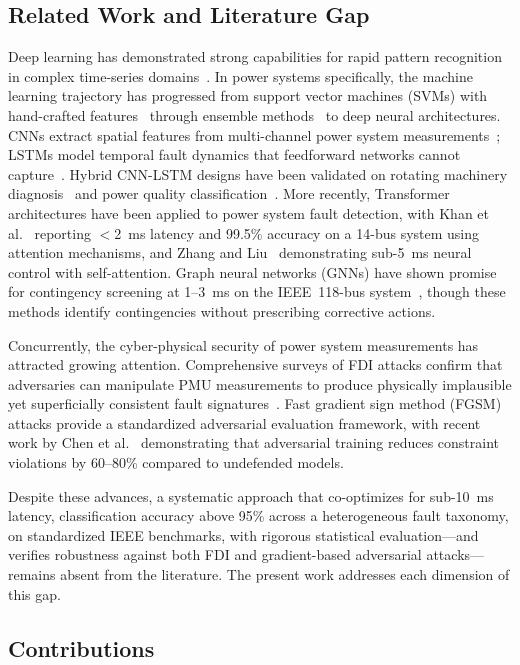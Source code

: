 \documentclass[journal]{IEEEtran}
\begin{document}
\subsection{Related Work and Literature Gap}

Deep learning has demonstrated strong capabilities for rapid pattern recognition in complex time-series domains~\cite{ref6}. In power systems specifically, the machine learning trajectory has progressed from support vector machines (SVMs) with hand-crafted features~\cite{ref7} through ensemble methods~\cite{ref8} to deep neural architectures. CNNs extract spatial features from multi-channel power system measurements~\cite{ref9}; LSTMs model temporal fault dynamics that feedforward networks cannot capture~\cite{ref10}. Hybrid CNN-LSTM designs have been validated on rotating machinery diagnosis~\cite{ref11} and power quality classification~\cite{ref12}. More recently, Transformer architectures have been applied to power system fault detection, with Khan et al.~\cite{ref_khan} reporting $<$2~ms latency and 99.5\% accuracy on a 14-bus system using attention mechanisms, and Zhang and Liu~\cite{ref_zhang_liu} demonstrating sub-5~ms neural control with self-attention. Graph neural networks (GNNs) have shown promise for contingency screening at 1--3~ms on the IEEE~118-bus system~\cite{ref18}, though these methods identify contingencies without prescribing corrective actions.

Concurrently, the cyber-physical security of power system measurements has attracted growing attention. Comprehensive surveys of FDI attacks confirm that adversaries can manipulate PMU measurements to produce physically implausible yet superficially consistent fault signatures~\cite{ref13,ref14}. Fast gradient sign method (FGSM) attacks provide a standardized adversarial evaluation framework, with recent work by Chen et al.~\cite{ref_chen} demonstrating that adversarial training reduces constraint violations by 60--80\% compared to undefended models.

Despite these advances, a systematic approach that co-optimizes for sub-10~ms latency, classification accuracy above 95\% across a heterogeneous fault taxonomy, on standardized IEEE benchmarks, with rigorous statistical evaluation---and verifies robustness against both FDI and gradient-based adversarial attacks---remains absent from the literature. The present work addresses each dimension of this gap.

\subsection{Contributions}
\end{document}
